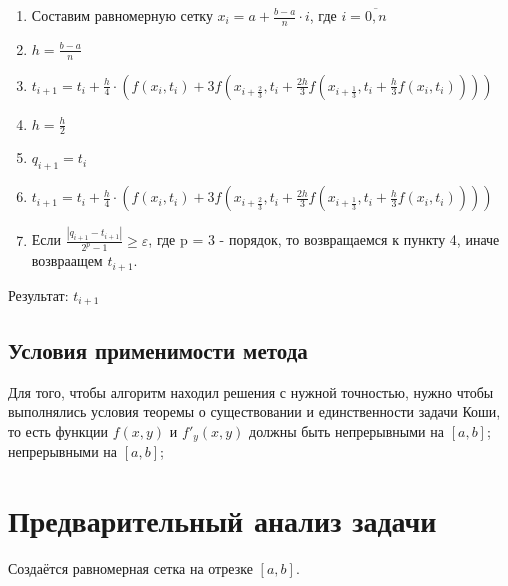 \documentclass{article}
\begin{document}
	\begin{enumerate}
		\item Составим равномерную сетку $x_i = a + \frac{b-a}{n}\cdot i$, где $i = \overline{0,n}$
		\item $h = \frac{b-a}{n} $
		\item $t_{i+1} = t_i + \frac{h}{4} \cdot (f(x_i,t_i)+3f(x_{i+\frac{2}{3}},t_i + \frac{2h}{3} f(x_{i+\frac{1}{3}}, t_i+\frac{h}{3}f(x_i,t_i))))$
		\item $h =  \frac{h}{2}$
		\item $q_{i+1} = t_{i}$
		\item $t_{i+1} = t_i + \frac{h}{4} \cdot (f(x_i,t_i)+3f(x_{i+\frac{2}{3}},t_i + \frac{2h}{3} f(x_{i+\frac{1}{3}}, t_i+\frac{h}{3}f(x_i,t_i))))$
		\item Если $\frac{|q_{i+1} - t_{i+1}|}{2^p-1} \geq \varepsilon$, где p = 3 - порядок, то возвращаемся к пункту 4, иначе возвраащем $t_{i+1}$.
	\end{enumerate}
	
	Результат: $t_{i+1}$
	
	\subsection{Условия применимости метода}
	Для того, чтобы алгоритм находил решения с нужной точностью, нужно чтобы выполнялись условия теоремы о существовании и единственности задачи Коши, то есть функции $f(x, y)$ и $f'_y(x, y)$ должны быть непрерывными на $[a, b]$;
	непрерывными на $[a, b]$;

	\section{Предварительный анализ задачи}
	Создаётся равномерная сетка на отрезке $[a, b]$.
	
\end{document}

